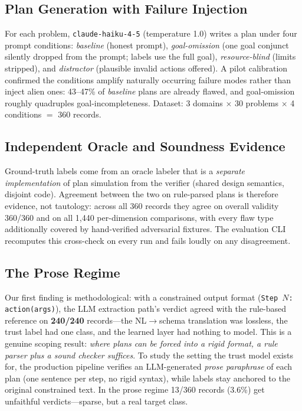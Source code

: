 \documentclass[letterpaper]{article}
\begin{document}
\subsection{Plan Generation with Failure Injection}

For each problem, \texttt{claude-haiku-4-5} (temperature 1.0) writes a plan
under four prompt conditions: \emph{baseline} (honest prompt),
\emph{goal-omission} (one goal conjunct silently dropped from the prompt;
labels use the full goal), \emph{resource-blind} (limits stripped), and
\emph{distractor} (plausible invalid actions offered). A pilot calibration
confirmed the conditions amplify naturally occurring failure modes rather
than inject alien ones: 43--47\% of \emph{baseline} plans are already
flawed, and goal-omission roughly quadruples goal-incompleteness. Dataset:
3 domains $\times$ 30 problems $\times$ 4 conditions $=$ 360 records.

\subsection{Independent Oracle and Soundness Evidence}

Ground-truth labels come from an oracle labeler that is a \emph{separate
implementation} of plan simulation from the verifier (shared design
semantics, disjoint code). Agreement between the two on rule-parsed plans is
therefore evidence, not tautology: across all 360 records they agree on
overall validity 360/360 and on all 1{,}440 per-dimension comparisons, with
every flaw type additionally covered by hand-verified adversarial fixtures.
The evaluation CLI recomputes this cross-check on every run and fails loudly
on any disagreement.

\subsection{The Prose Regime}
\label{sec:prose}

Our first finding is methodological: with a constrained output format
(\texttt{Step $N$: action(args)}), the LLM extraction path's verdict agreed
with the rule-based reference on \textbf{240/240} records---the
NL$\to$schema translation was lossless, the trust label had one class, and
the learned layer had nothing to model. This is a genuine scoping result:
\emph{where plans can be forced into a rigid format, a rule parser plus a
sound checker suffices}. To study the setting the trust model exists for,
the production pipeline verifies an LLM-generated \emph{prose paraphrase} of
each plan (one sentence per step, no rigid syntax), while labels stay
anchored to the original constrained text. In the prose regime 13/360
records (3.6\%) get unfaithful verdicts---sparse, but a real target class.
\end{document}
